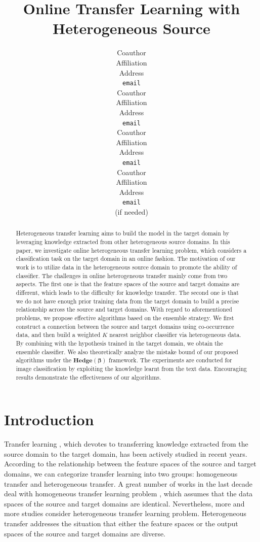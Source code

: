 \documentclass{article} %
\title{Online Transfer Learning with Heterogeneous Source}
\author{
Coauthor \\
Affiliation \\
Address \\
\texttt{email} \\
\AND
Coauthor \\
Affiliation \\
Address \\
\texttt{email} \\
\And
Coauthor \\
Affiliation \\
Address \\
\texttt{email} \\
\And
Coauthor \\
Affiliation \\
Address \\
\texttt{email} \\
(if needed)\\
}
\theoremstyle{remark}
\theoremstyle{definition}
\begin{document}
\maketitle

\begin{abstract}
Heterogeneous transfer learning aims to build the model in the target domain by leveraging knowledge extracted from other heterogeneous source domains.
In this paper, we investigate online heterogeneous transfer learning problem, which considers a classification task on the target domain in an online fashion.
The motivation of our work is to utilize data in the heterogeneous source domain to promote the ability of classifier.
The challenges in online heterogeneous transfer mainly come from two aspects.
The first one is that the feature spaces of the source and target domains are different, which leads to the difficulty for knowledge transfer.
The second one is that we do not have enough prior training data from the target domain to build a precise relationship across the source and target domains.
With regard to aforementioned problems, we propose effective algorithms based on the ensemble strategy.
We first construct a connection between the source and target domains using co-occurrence data, and then build a weighted $K$ nearest neighbor classifier via heterogeneous data.
By combining with the hypothesis trained in the target domain, we obtain the ensemble classifier.
We also theoretically analyze the mistake bound of our proposed algorithms under the $\mathbf{Hedge(\beta)}$ framework.
The experiments are conducted for image classification by exploiting the knowledge learnt from the text data.
Encouraging results demonstrate the effectiveness of our algorithms.
\end{abstract}

\section{Introduction}
Transfer learning \cite{pan2010survey}, which devotes to transferring knowledge extracted from the source domain to the target domain, has been actively studied in recent years.
According to the relationship between the feature spaces of the source and target domains, we can categorize transfer learning into two groups: homogeneous transfer and heterogeneous transfer.
A great number of works in the last decade deal with homogeneous transfer learning problem \cite{liao2005logistic,dai2007boosting,dai2007transferring,eaton2011selective}, which assumes that the data spaces of the source and target domains are identical.
Nevertheless, more and more studies consider heterogeneous transfer learning problem.
Heterogeneous transfer addresses the situation that either the feature spaces or the output spaces of the source and target domains are diverse.
\end{document}
